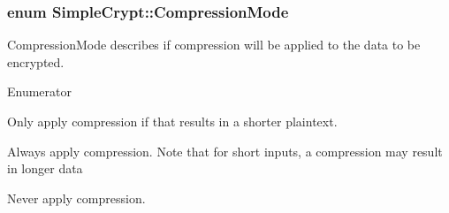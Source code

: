 \subsubsection[{Compression\+Mode}]{\setlength{\rightskip}{0pt plus 5cm}enum {\bf Simple\+Crypt\+::\+Compression\+Mode}}\label{class_simple_crypt_a25298e746f175cf175a18f082092ca8e}
Compression\+Mode describes if compression will be applied to the data to be encrypted. \begin{Desc}
\item[Enumerator]\par
\begin{description}
\item[{\em 
\hypertarget{class_simple_crypt_a25298e746f175cf175a18f082092ca8ea8d04b76ed73553456ec87e88b18ddc66}{}Compression\+Auto\label{class_simple_crypt_a25298e746f175cf175a18f082092ca8ea8d04b76ed73553456ec87e88b18ddc66}
}]Only apply compression if that results in a shorter plaintext. \item[{\em 
\hypertarget{class_simple_crypt_a25298e746f175cf175a18f082092ca8ea10aec29129f4e6d08c4f61d7008ec8f7}{}Compression\+Always\label{class_simple_crypt_a25298e746f175cf175a18f082092ca8ea10aec29129f4e6d08c4f61d7008ec8f7}
}]Always apply compression. Note that for short inputs, a compression may result in longer data \item[{\em 
\hypertarget{class_simple_crypt_a25298e746f175cf175a18f082092ca8eadc794d925e3af54dcef9a24ee3f60f6d}{}Compression\+Never\label{class_simple_crypt_a25298e746f175cf175a18f082092ca8eadc794d925e3af54dcef9a24ee3f60f6d}
}]Never apply compression. \end{description}
\end{Desc}
\hypertarget{class_simple_crypt_ab7f81049e78f021b55a36f7cfac5a09b}{}
